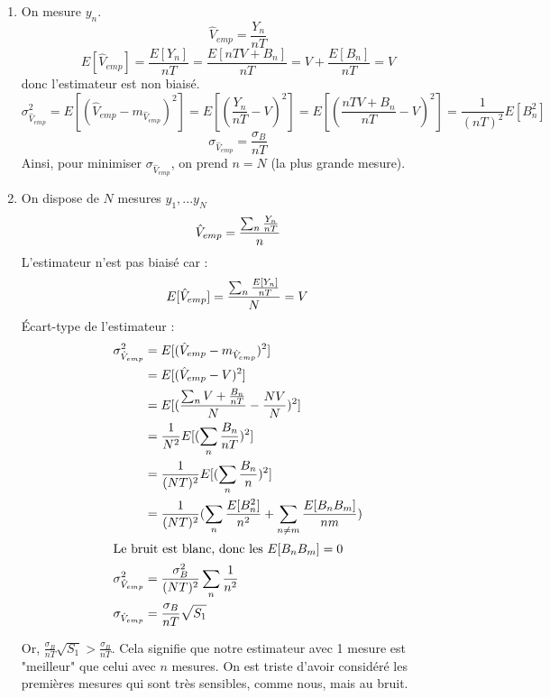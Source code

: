 \documentclass[main.tex]{subfiles}
\begin{document}
\begin{enumerate}\setlength{\itemsep}{10mm}
\item On mesure $y_n$. \[\hat{V}_{emp}=\frac{Y_n}{nT}\]
\[E[\hat{V}_{emp}] = \frac{E[Y_n]}{nT}=\frac{E[nTV+B_n]}{nT} = V+\frac{E[B_n]}{nT} = V\]
donc l'estimateur est non biaisé.
\[\sigma_{\hat{V}_{emp}}^2 = E[(\hat{V}_{emp}-m_{\hat{V}_{emp}})^2] = E[(\frac{Y_n}{nT}-V)^2] = E[(\frac{nTV+B_n}{nT}-V)^2] = \frac{1}{(nT)^2}E[B_n^2]\]
\[\sigma_{\hat{V}_{emp}}=\frac{\sigma_B}{nT}\]
Ainsi, pour minimiser $\sigma_{\hat{V}_{emp}}$, on prend $n=N$ (la plus grande mesure).

\item On dispose de $N$ mesures $y_1,...y_N$
\[\hat{V}_{emp}=\frac{\sum_n \frac{Y_n}{nT}}{n}\]
L'estimateur n'est pas biaisé car :
\[ E[\hat{V}_{emp}] = \frac{\sum_n \frac{E[Y_n]}{nT}}{N}=V\]
Écart-type de l'estimateur :
\begin{align*}
\sigma_{\hat{V}_{emp}}^2 & = E[(\hat{V}_{emp}-m_{\hat{V}_{emp}})^2]\\
& = E[(\hat{V}_{emp}-V)^2] \\
& = E[(\frac{\sum_n V+\frac{B_n}{nT}}{N}- \frac{NV}{N})^2] \\
& = \frac{1}{N^2}E[(\sum_n\frac{B_n}{nT})^2] \\
& = \frac{1}{(NT)^2}E[(\sum_n \frac{B_n}{n})^2] \\
& = \frac{1}{(NT)^2}(\sum_n\frac{E[B_n^2]}{n^2}+\sum_{n\neq m}\frac{E[B_nB_m]}{nm}) \\
\intertext{Le bruit est blanc, donc les $E[B_nB_m]=0$}
\sigma_{\hat{V}_{emp}}^2 & = \frac{\sigma_B^2}{(NT)^2}\sum_n\frac{1}{n^2} \\
\sigma_{\hat{V}_{emp}}  & = \frac{\sigma_B}{nT}\sqrt{S_1}
\end{align*}

Or, $\frac{\sigma_B}{nT}\sqrt{S_1} > \frac{\sigma_B}{nT}$. Cela signifie que notre estimateur avec 1 mesure est "meilleur" que celui avec $n$ mesures. On est triste d'avoir considéré les premières mesures qui sont très sensibles, comme nous, mais au bruit.
\end{enumerate}
\end{document}
